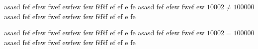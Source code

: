 \documentclass[12pt,a4paper]{article}
\begin{document}
asasd fef efew fwef ewfew few fšfšf ef ef e fe
asasd fef efew fwef ew
$10002\neq100000$
asasd fef efew fwef ewfew few fšfšf ef ef e fe

asasd fef efew fwef ewfew few fšfšf ef ef e fe
asasd fef efew fwef ew
$10002=100000$
asasd fef efew fwef ewfew few fšfšf ef ef e fe
\end{document}
